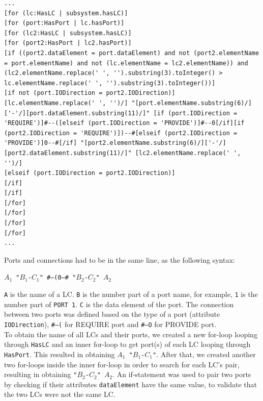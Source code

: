 \begin{lstlisting}[caption=Defining ports and connections,label=code:defining_ports_connections]
...
[for (lc:HasLC | subsystem.hasLC)]
[for (port:HasPort | lc.hasPort)]
[for (lc2:HasLC | subsystem.hasLC)]
[for (port2:HasPort | lc2.hasPort)]
[if ((port2.dataElement = port.dataElement) and not (port2.elementName = port.elementName) and not (lc.elementName = lc2.elementName)) and (lc2.elementName.replace(' ', '').substring(3).toInteger() > lc.elementName.replace(' ', '').substring(3).toInteger())]
[if not (port.IODirection = port2.IODirection)]
[lc.elementName.replace(' ', '')/] "[port.elementName.substring(6)/]['-'/][port.dataElement.substring(11)/]" [if (port.IODirection = 'REQUIRE')]#--([elseif (port.IODirection = 'PROVIDE')]#--0[/if][if (port2.IODirection = 'REQUIRE')])--#[elseif (port2.IODirection = 'PROVIDE')]0--#[/if] "[port2.elementName.substring(6)/]['-'/][port2.dataElement.substring(11)/]" [lc2.elementName.replace(' ', '')/]
[elseif (port.IODirection = port2.IODirection)]
[/if]
[/if]
[/for]
[/for]
[/for]
[/for]
...
\end{lstlisting}

Ports and connections had to be in the same line, as the following syntax:\\
\begin{center}
\texttt{$A_1$ "$B_1$-$C_1$" \#--(0--\# "$B_2$-$C_2$" $A_2$}
\end{center}
\vspace{1em}
\texttt{A} is the name of a LC. \texttt{B} is the number part of a port name, for example, \texttt{1} is the number part of \texttt{PORT 1}. \texttt{C} is the data element of the port. The connection between two ports was defined based on the type of a port (attribute \texttt{IODirection}), \texttt{\#--(} for REQUIRE port and \texttt{\#--O} for PROVIDE port. \\

To obtain the name of all LCs and their ports, we created a new for-loop looping through \texttt{HasLC} and an inner for-loop to get port(s) of each LC looping through \texttt{HasPort}. This resulted in obtaining \texttt{$A_1$ "$B_1$-$C_1$"}. After that, we created another two for-loops inside the inner for-loop in order to search for each LC's pair, resulting in obtaining \texttt{"$B_2$-$C_2$" $A_2$}. An if-statement was used to pair two ports by checking if their attributes \texttt{dataElement} have the same value, to validate that the two LCs were not the same LC.

